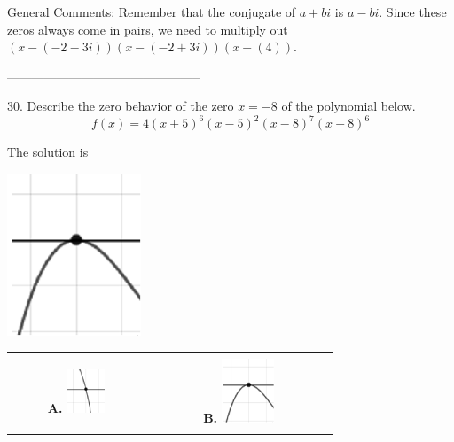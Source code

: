 \documentclass{extbook}[14pt]
\begin{document}
General Comments: Remember that the conjugate of $a+bi$ is $a-bi$. Since these zeros always come in pairs, we need to multiply out $(x-(-2 - 3i))(x-(-2 + 3i))(x-(4))$.

-----------------------------------------------

30. Describe the zero behavior of the zero $x = -8$ of the polynomial below.
\[ f(x) = 4(x + 5)^{6}(x - 5)^{2}(x - 8)^{7}(x + 8)^{6} \] 

 
 The solution is  
 \begin{center} \includegraphics[width=0.3\textwidth]{../Figures/polyZeroBehaviorBB.png} \end{center}\begin{tabular}{|c|c|} 
\hline 
 & \tabularnewline 
 \textbf{A.} \includegraphics[width=0.3\textwidth]{../Figures/polyZeroBehaviorAB.png} & \textbf{B.} \includegraphics[width=0.3\textwidth]{../Figures/polyZeroBehaviorBB.png} \tabularnewline 
\hline 
 & \tabularnewline 

\end{tabular}
\end{document}
